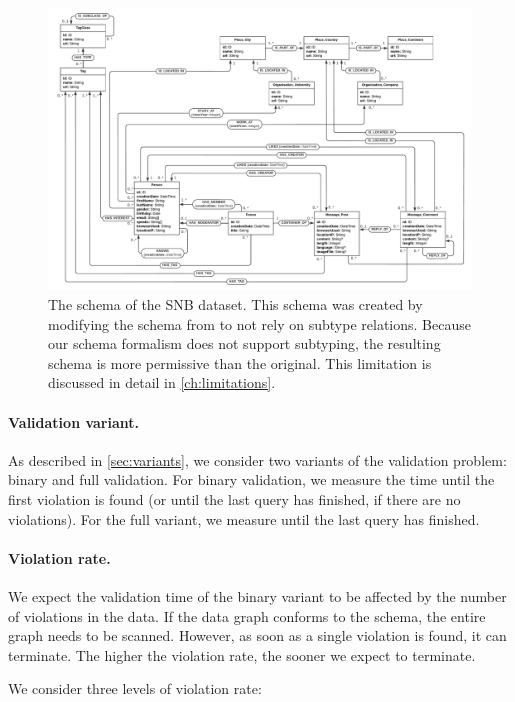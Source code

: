\documentclass{report}
\theoremstyle{definition}
\begin{document}
\begin{figure}[t]
  \centering
  \includegraphics[width=\textwidth]{figures/schema-snb.pdf}
  \caption[The schema of the SNB dataset]{The schema of the SNB dataset. This schema was created by modifying the schema from \citet{angles2020snb} to not rely on subtype relations. Because our schema formalism does not support subtyping, the resulting schema is more permissive than the original. This limitation is discussed in detail in \autoref{ch:limitations}.}
  \label{fig:schema-snb}
\end{figure}

\paragraph{Validation variant.} As described in \autoref{sec:variants}, we consider two variants of the validation problem: binary and full validation. For binary validation, we measure the time until the first violation is found (or until the last query has finished, if there are no violations). For the full variant, we measure until the last query has finished.

\paragraph{Violation rate.} We expect the validation time of the binary variant to be affected by the number of violations in the data. If the data graph conforms to the schema, the entire graph needs to be scanned. However, as soon as a single violation is found, it can terminate. The higher the violation rate, the sooner we expect to terminate.

We consider three levels of violation rate:
\end{document}
